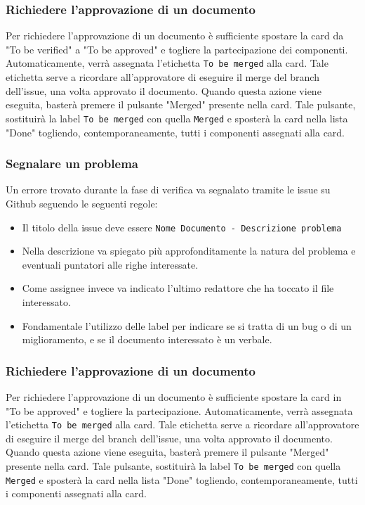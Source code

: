 \subsubsection{Richiedere l'approvazione di un documento}
Per richiedere l'approvazione di un documento è sufficiente spostare la card da "To be verified" a "To be approved" e togliere la partecipazione dei componenti. Automaticamente, verrà assegnata l'etichetta \texttt{To be merged} alla card. Tale etichetta serve a ricordare all'approvatore di eseguire il merge del branch dell'issue, una volta approvato il documento.
Quando questa azione viene eseguita, basterà premere il pulsante "Merged" presente nella card. Tale pulsante, sostituirà la label \texttt{To be merged} con quella \texttt{Merged} e sposterà la card nella lista "Done" togliendo, contemporaneamente, tutti i componenti assegnati alla card.


\subsubsection{Segnalare un problema}
Un errore trovato durante la fase di verifica va segnalato tramite le issue su Github
seguendo le seguenti regole:
\begin{itemize}
    \item Il titolo della issue deve essere
    \texttt{Nome Documento - Descrizione problema}
    \item Nella descrizione va spiegato più approfonditamente la natura del
    problema e eventuali puntatori alle righe interessate.
    \item  Come assignee invece va indicato l'ultimo redattore che ha toccato il file
    interessato.
    \item Fondamentale l'utilizzo delle label per indicare se si tratta
    di un bug o di un miglioramento, e se il documento interessato è un verbale.
\end{itemize}

\subsubsection{Richiedere l'approvazione di un documento}
Per richiedere l'approvazione di un documento è sufficiente spostare la card in "To be approved" e togliere la partecipazione. Automaticamente, verrà assegnata l'etichetta \texttt{To be merged} alla card. Tale etichetta serve a ricordare all'approvatore di eseguire il merge del branch dell'issue, una volta approvato il documento.
Quando questa azione viene eseguita, basterà premere il pulsante "Merged" presente nella card. Tale pulsante, sostituirà la label \texttt{To be merged} con quella \texttt{Merged} e sposterà la card nella lista "Done" togliendo, contemporaneamente, tutti i componenti assegnati alla card.

